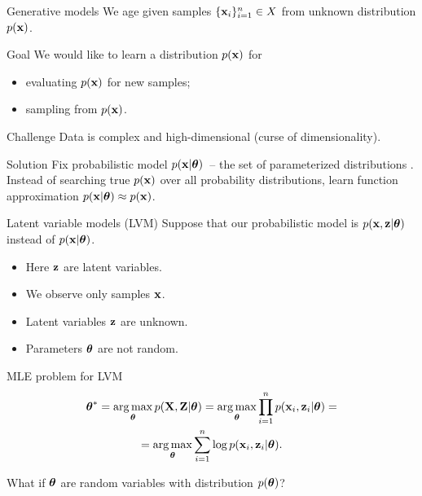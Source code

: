 \begin{frame}{Generative models}
    We age given samples $\{\mathbf{x}_i\}_{i=1}^n \in X$ from unknown distribution $p(\mathbf{x})$.
    
    \begin{block}{Goal}
    	We would like to learn a distribution $p(\mathbf{x})$ for 
    	\begin{itemize}
    	    \item evaluating $p(\mathbf{x})$ for new samples;
    	    \item sampling from $p(\mathbf{x})$.
    	\end{itemize}
    \end{block}
    \begin{block}{Challenge}
    	 Data is complex and high-dimensional (curse of dimensionality).
    \end{block}
    \begin{block}{Solution}
        Fix probabilistic model $p(\mathbf{x} | \boldsymbol{\theta})$~-- the set of parameterized distributions . \\
        Instead of searching true $p(\mathbf{x})$ over all probability distributions, learn function approximation $p(\mathbf{x} | \boldsymbol{\theta}) \approx p(\mathbf{x})$.
    \end{block}
\end{frame}
\begin{frame}{Latent variable models (LVM)}
    Suppose that our probabilistic model is $p(\mathbf{x}, \mathbf{z} | \boldsymbol{\theta})$ instead of $p(\mathbf{x} | \boldsymbol{\theta})$.
    \begin{itemize}
        \item Here $\mathbf{z}$ are latent variables.
        \item We observe only samples $\mathbf{x}$. 
        \item Latent variables $\mathbf{z}$ are unknown.
        \item Parameters $\boldsymbol{\theta}$ are not random.
    \end{itemize}
    \begin{block}{MLE problem for LVM}
    \vspace{-0.3cm}
    \begin{multline*}
        \boldsymbol{\theta}^* = \operatorname*{arg\,max}_{\boldsymbol{\theta}} p(\mathbf{X}, \mathbf{Z} | \boldsymbol{\theta}) = \operatorname*{arg\,max}_{\boldsymbol{\theta}} \prod_{i=1}^n p(\mathbf{x}_i, \mathbf{z}_i | \boldsymbol{\theta}) = \\ = \operatorname*{arg\,max}_{\boldsymbol{\theta}} \sum_{i=1}^n \log p(\mathbf{x}_i, \mathbf{z}_i | \boldsymbol{\theta}).
    \end{multline*}
    \vspace{-0.1cm}
    \end{block}
    What if $\boldsymbol{\theta}$ are random variables with distribution $p(\boldsymbol{\theta})$?
\end{frame}
